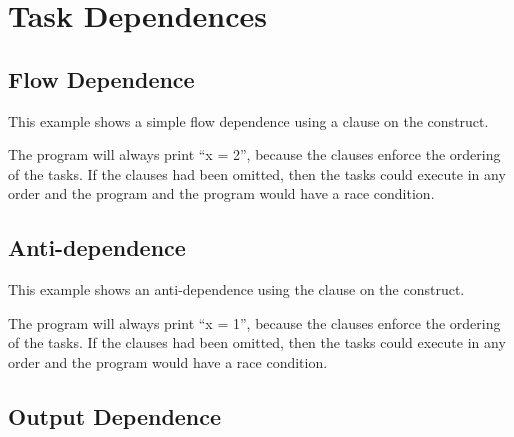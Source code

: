 \pagebreak
\section{Task Dependences}
\label{sec:task_depend}

\subsection{Flow Dependence}
\label{subsec:task_flow_depend}

This example shows a simple flow dependence using a  
clause on the  construct.



The program will always print ``x = 2'', because the  
clauses enforce the ordering of the tasks. If the  clauses had been 
omitted, then the tasks could execute in any order and the program and the program 
would have a race condition.

\subsection{Anti-dependence}
\label{subsec:task_anti_depend}

This example shows an anti-dependence using the  
clause on the  construct.



The program will always print ``x = 1'', because the  
clauses enforce the ordering of the tasks. If the  clauses had been 
omitted, then the tasks could execute in any order and the program would have a 
race condition.

\subsection{Output Dependence}
\label{subsec:task_out_depend}

